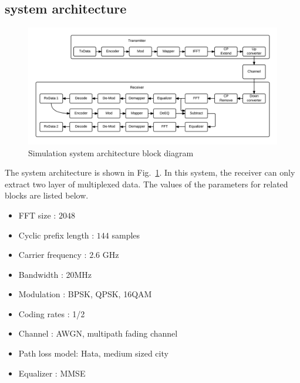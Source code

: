 \subsection{system architecture}
\begin{figure}[t]
\begin{center}
\includegraphics[width=0.95\columnwidth ,angle=0]{figure/systemArch.png}
\caption{Simulation system architecture block diagram}
\label{fig_sys_arch}
\end{center}
\end{figure}
The system architecture is shown in Fig.~\ref{fig_sys_arch}.
In this system, the receiver can only extract two layer of multiplexed data.
The values of the parameters for related blocks are listed below.
\begin{itemize}
  \item FFT size : $2048$
  \item Cyclic prefix length : $144$ samples
  \item Carrier frequency : $2.6$ GHz
  \item Bandwidth : 20MHz
  \item Modulation : BPSK, QPSK, 16QAM
  \item Coding rates : 1/2
  \item Channel : AWGN, multipath fading channel
  \item Path loss model: Hata, medium sized city
  \item Equalizer : MMSE
\end{itemize}